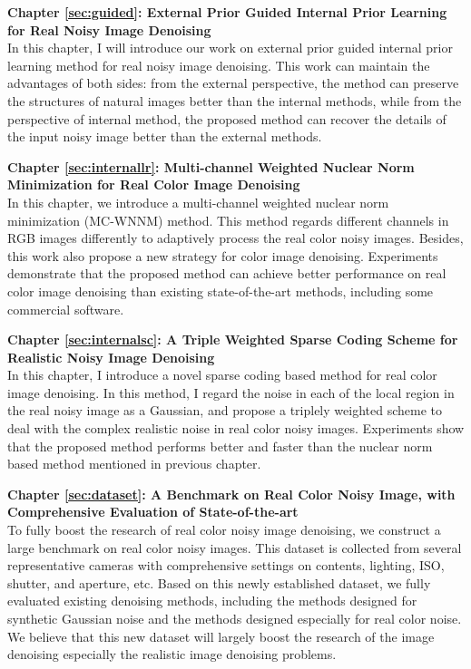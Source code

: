 \textbf{Chapter \ref{sec:guided}: External Prior Guided Internal Prior Learning for Real Noisy Image Denoising} \\[0.2em]

In this chapter, I will introduce our work on external prior guided internal prior learning method for real noisy image denoising. This work can maintain the advantages of both sides: from the external perspective, the method can preserve the structures of natural images better than the internal methods, while from the perspective of internal method, the proposed method can recover the details of the input noisy image better than the external methods.



\textbf{Chapter \ref{sec:internallr}: Multi-channel Weighted Nuclear Norm Minimization for Real Color Image Denoising} \\[0.2em]

In this chapter, we introduce a multi-channel weighted nuclear norm minimization (MC-WNNM) method. This method regards different channels in RGB images differently to adaptively process the real color noisy images. Besides, this work also propose a new strategy for color image denoising. Experiments demonstrate that the proposed method can achieve better performance on real color image denoising than existing state-of-the-art methods, including some commercial software.



\textbf{Chapter \ref{sec:internalsc}: A Triple Weighted Sparse Coding Scheme for Realistic Noisy Image Denoising} \\[0.2em]

In this chapter, I introduce a novel sparse coding based method for real color image denoising. In this method, I regard the noise in each of the local region in the real noisy image as a Gaussian, and propose a triplely weighted scheme to deal with the complex realistic noise in real color noisy images. Experiments show that the proposed method performs better and faster than the nuclear norm based method mentioned in previous chapter.


\textbf{Chapter \ref{sec:dataset}: A Benchmark on Real Color Noisy Image, with Comprehensive Evaluation of State-of-the-art} \\[0.2em]

To fully boost the research of real color noisy image denoising, we construct a large benchmark on real color noisy images. This dataset is collected from several representative cameras with comprehensive settings on contents, lighting, ISO, shutter, and aperture, etc. Based on this newly established dataset, we fully evaluated existing denoising methods, including the methods designed for synthetic Gaussian noise and the methods designed especially for real color noise. We believe that this new dataset will largely boost the research of the image denoising especially the realistic image denoising problems.
















